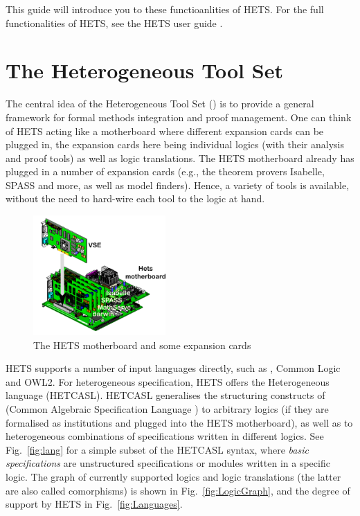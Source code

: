 \documentclass{article}
\newcommand{\normalTEXTSC}[2]{{#1\scriptsize#2}}
\newcommand     {\Hets}{\normalTEXTSC{H}{ETS}\xspace}
\newcommand{\HetCASL}{\normalTEXTSC{H}{ET}\normalTEXTSC{C}{ASL}\xspace}
\begin{document}
This guide will introduce you to these functioanlities of \Hets.
For the full functionalities of \Hets, see the \Hets user guide  
\cite{HetsUserGuide}.


\section{The Heterogeneous Tool Set}

The central idea of the Heterogeneous Tool Set (\protect\Hets) is to
provide a general framework for formal methods integration and proof
management. One can think of \Hets acting like a motherboard where
different expansion cards can be plugged in, the expansion cards here
being individual logics (with their analysis and proof tools) as well
as logic translations. The \Hets motherboard already has plugged in
a number of expansion cards (e.g., the theorem provers Isabelle, SPASS
and more, as well as model finders). Hence, a variety of tools is
available, without the need to hard-wire each tool to the logic at
hand.
\begin{figure}
\begin{center}
  \includegraphics[width=0.45\textwidth]{hets-motherboard}
\end{center}
\caption{The \Hets motherboard and some expansion cards}
\end{figure}

\Hets supports a number of input languages directly, such as \CASL,
Common Logic and OWL2. For heterogeneous
specification, \Hets offers the Heterogeneous \CASL language (\HetCASL).
 \HetCASL generalises the structuring
constructs of
\CASL (Common Algebraic Specification Language \cite{CASL-UM,CASL/RefManual}) to arbitrary logics
(if they are formalised as institutions and plugged into
the \Hets motherboard), as well as to heterogeneous
combinations of specifications written in different logics.
See
Fig.~\ref{fig:lang} for a simple subset of the
\HetCASL syntax, where \emph{basic specifications} are unstructured
specifications or modules written in a specific logic.  The graph of
currently supported logics and logic translations (the latter are also
called comorphisms) is shown in Fig.~\ref{fig:LogicGraph}, and the
degree of support by \Hets in Fig.~\ref{fig:Languages}.
\end{document}
